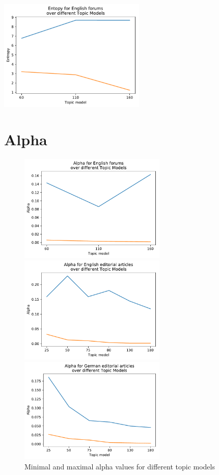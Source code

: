 \includegraphics[width=7cm]{gfx/Eval_IC/English forums_Entropy.pdf}

\section{Alpha}
\begin{figure}[t]
	\centering
	\includegraphics[width=7cm]{gfx/Eval_IC/English forums_Alpha.pdf}\par\medskip
	\begin{minipage}{0.5\textwidth}
		\centering
		\includegraphics[width=7cm]{gfx/Eval_IC/English_Editorial_Alpha.pdf}
	\end{minipage}%
	\begin{minipage}{0.5\textwidth}
		\centering
		\includegraphics[width=7cm]{gfx/Eval_IC/German_Editorial_Alpha.pdf}
	\end{minipage}
	\caption[]{Minimal and maximal alpha values for different topic models}
\end{figure}


